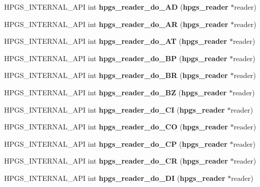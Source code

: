 \begin{DoxyCompactItemize}
\item 
HPGS\_\-INTERNAL\_\-API int {\bfseries hpgs\_\-reader\_\-do\_\-AD} ({\bf hpgs\_\-reader} $\ast$reader)\label{group__reader_ga252127da0d20f8cd4e12a237b6ffd607}

\item 
HPGS\_\-INTERNAL\_\-API int {\bfseries hpgs\_\-reader\_\-do\_\-AR} ({\bf hpgs\_\-reader} $\ast$reader)\label{group__reader_ga86a3dddc71091bb81d539c66d24fc4c9}

\item 
HPGS\_\-INTERNAL\_\-API int {\bfseries hpgs\_\-reader\_\-do\_\-AT} ({\bf hpgs\_\-reader} $\ast$reader)\label{group__reader_gafaf903cb7a0bee57742b36cf3bda84ef}

\item 
HPGS\_\-INTERNAL\_\-API int {\bfseries hpgs\_\-reader\_\-do\_\-BP} ({\bf hpgs\_\-reader} $\ast$reader)\label{group__reader_ga69c12a593041db66395999b17ff614f3}

\item 
HPGS\_\-INTERNAL\_\-API int {\bfseries hpgs\_\-reader\_\-do\_\-BR} ({\bf hpgs\_\-reader} $\ast$reader)\label{group__reader_ga9a5a78c77c1bbe343f0a54a035b3daee}

\item 
HPGS\_\-INTERNAL\_\-API int {\bfseries hpgs\_\-reader\_\-do\_\-BZ} ({\bf hpgs\_\-reader} $\ast$reader)\label{group__reader_ga14d74945da68ed7c713e2ba8b6deef16}

\item 
HPGS\_\-INTERNAL\_\-API int {\bfseries hpgs\_\-reader\_\-do\_\-CI} ({\bf hpgs\_\-reader} $\ast$reader)\label{group__reader_ga7dd9c64eff1ea790e1b43a81b2586af6}

\item 
HPGS\_\-INTERNAL\_\-API int {\bfseries hpgs\_\-reader\_\-do\_\-CO} ({\bf hpgs\_\-reader} $\ast$reader)\label{group__reader_ga010ac6b403b6ef801122e303784506e3}

\item 
HPGS\_\-INTERNAL\_\-API int {\bfseries hpgs\_\-reader\_\-do\_\-CP} ({\bf hpgs\_\-reader} $\ast$reader)\label{group__reader_ga59c9616bc0e3e63266eede7f0e40ab27}

\item 
HPGS\_\-INTERNAL\_\-API int {\bfseries hpgs\_\-reader\_\-do\_\-CR} ({\bf hpgs\_\-reader} $\ast$reader)\label{group__reader_ga6f9a3d39f1ec43f65de23f39cbcc4bcd}

\item 
HPGS\_\-INTERNAL\_\-API int {\bfseries hpgs\_\-reader\_\-do\_\-DI} ({\bf hpgs\_\-reader} $\ast$reader)\label{group__reader_gacb1099ab784c6f006f90a555e999d03c}


\end{DoxyCompactItemize}
